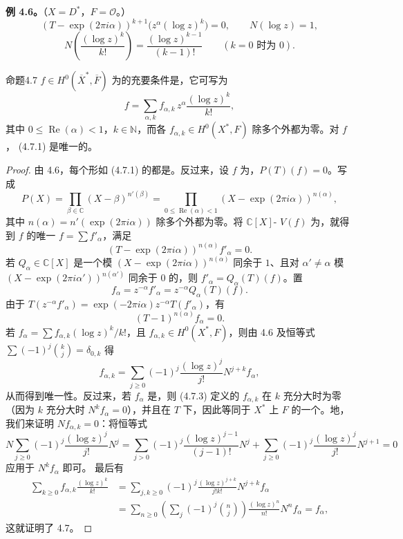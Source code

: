 \textbf{例 4.6。}（$X=D^*$，$F=\mathscr O$。）
\[
 (T-\exp(2\pi i\alpha))^{k+1}\bigl(z^\alpha(\log z)^k\bigr)=0,
 \qquad N(\log z)=1,
\]
\[
 N\left(\frac{(\log z)^k}{k!}\right)=\frac{(\log z)^{k-1}}{(k-1)!}
 \qquad(k=0\text{ 时为 }0).
\]

\begin{SGAresult}{命题}{4.7}
 $f\in H^0(\overline X^*,\overline F)$ 为的充要条件是，它可写为
\[
 f=\sum_{\alpha,k}f_{\alpha,k}\,z^\alpha\frac{(\log z)^k}{k!},\tag{4.7.1}
\]
其中 $0\leq\operatorname{Re}(\alpha)<1$，$k\in\mathbb N$，而各 $f_{\alpha,k}\in H^0(X^*,F)$ 除多个外都为零。对 $f$， (4.7.1) 是唯一的。
\end{SGAresult}
\begin{proof}
由 4.6，每个形如 (4.7.1) 的都是。反过来，设 $f$ 为，$P(T)(f)=0$。写成
\[
 P(X)=\prod_{\beta\in\mathbb C}(X-\beta)^{n'(\beta)}
 =\prod_{0\leq\operatorname{Re}(\alpha)<1}(X-\exp(2\pi i\alpha))^{n(\alpha)},
\]
其中 $n(\alpha)=n'(\exp(2\pi i\alpha))$ 除多个外都为零。将 $\mathbb C[X]$- $V(f)$ 为，就得到 $f$ 的唯一 $f=\sum f'_\alpha$，满足
\[
 (T-\exp(2\pi i\alpha))^{n(\alpha)}f'_\alpha=0.
\]
若 $Q_\alpha\in\mathbb C[X]$ 是一个模 $(X-\exp(2\pi i\alpha))^{n(\alpha)}$ 同余于 $1$、且对 $\alpha'\neq\alpha$ 模 $(X-\exp(2\pi i\alpha'))^{n(\alpha')}$ 同余于 $0$ 的，则 $f'_\alpha=Q_\alpha(T)(f)$。置
\[
 f_\alpha=z^{-\alpha}f'_\alpha=z^{-\alpha}Q_\alpha(T)(f).\tag{4.7.2}
\]
由于 $T(z^{-\alpha}f'_\alpha)=\exp(-2\pi i\alpha)z^{-\alpha}T(f'_\alpha)$，有
\[
 (T-1)^{n(\alpha)}f_\alpha=0.
\]
若 $f_\alpha=\sum f_{\alpha,k}(\log z)^k/k!$，且 $f_{\alpha,k}\in H^0(X^*,F)$，则由 4.6 及恒等式 $\sum(-1)^j\binom{k}{j}=\delta_{0,k}$ 得
\[
 f_{\alpha,k}=\sum_{j\geq0}(-1)^j\frac{(\log z)^j}{j!}N^{j+k}f_\alpha,\tag{4.7.3}
\]
从而得到唯一性。反过来，若 $f_\alpha$ 是，则 (4.7.3) 定义的 $f_{\alpha,k}$ 在 $k$ 充分大时为零（因为 $k$ 充分大时 $N^kf_\alpha=0$），并且在 $T$ 下，因此等同于 $X^*$ 上 $F$ 的一个。地，我们来证明 $Nf_{\alpha,k}=0$：将恒等式
\[
 N\sum_{j\geq0}(-1)^j\frac{(\log z)^j}{j!}N^j
 =\sum_{j>0}(-1)^j\frac{(\log z)^{j-1}}{(j-1)!}N^j
 +\sum_{j\geq0}(-1)^j\frac{(\log z)^j}{j!}N^{j+1}=0
\]
应用于 $N^kf_\alpha$ 即可。
最后有
\[
\begin{aligned}
 \sum_{k\geq0}f_{\alpha,k}\frac{(\log z)^k}{k!}
 &=\sum_{j,k\geq0}(-1)^j\frac{(\log z)^{j+k}}{j!k!}N^{j+k}f_\alpha\\
 &=\sum_{n\geq0}\left(\sum_j(-1)^j\binom nj\right)
 \frac{(\log z)^n}{n!}N^nf_\alpha=f_\alpha,
\end{aligned}
\]
这就证明了 4.7。
\end{proof}

